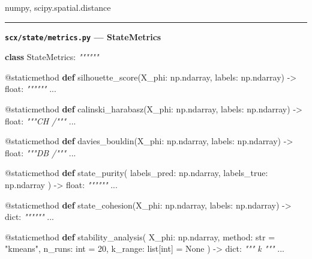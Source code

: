 \documentclass[
  12pt,
]{article}
\newenvironment{Shaded}{}{}
\newcommand{\AttributeTok}[1]{\textcolor[rgb]{0.49,0.56,0.16}{#1}}
\newcommand{\BuiltInTok}[1]{\textcolor[rgb]{0.00,0.50,0.00}{#1}}
\newcommand{\CommentTok}[1]{\textcolor[rgb]{0.38,0.63,0.69}{\textit{#1}}}
\newcommand{\DecValTok}[1]{\textcolor[rgb]{0.25,0.63,0.44}{#1}}
\newcommand{\KeywordTok}[1]{\textcolor[rgb]{0.00,0.44,0.13}{\textbf{#1}}}
\newcommand{\NormalTok}[1]{#1}
\newcommand{\OperatorTok}[1]{\textcolor[rgb]{0.40,0.40,0.40}{#1}}
\newcommand{\StringTok}[1]{\textcolor[rgb]{0.25,0.44,0.63}{#1}}
\newcommand{\VariableTok}[1]{\textcolor[rgb]{0.10,0.09,0.49}{#1}}
\begin{document}
numpy, scipy.spatial.distance

\begin{center}\rule{0.5\linewidth}{0.5pt}\end{center}

\textbf{\texttt{scx/state/metrics.py} --- StateMetrics}



\begin{Shaded}
\begin{Highlighting}[]
\KeywordTok{class}\NormalTok{ StateMetrics:}
    \CommentTok{""""""}

    \AttributeTok{@staticmethod}
    \KeywordTok{def}\NormalTok{ silhouette\_score(X\_phi: np.ndarray, labels: np.ndarray) }\OperatorTok{{-}\textgreater{}} \BuiltInTok{float}\NormalTok{:}
        \CommentTok{""""""}
\NormalTok{        ...}

    \AttributeTok{@staticmethod}
    \KeywordTok{def}\NormalTok{ calinski\_harabasz(X\_phi: np.ndarray, labels: np.ndarray) }\OperatorTok{{-}\textgreater{}} \BuiltInTok{float}\NormalTok{:}
        \CommentTok{"""CH /"""}
\NormalTok{        ...}

    \AttributeTok{@staticmethod}
    \KeywordTok{def}\NormalTok{ davies\_bouldin(X\_phi: np.ndarray, labels: np.ndarray) }\OperatorTok{{-}\textgreater{}} \BuiltInTok{float}\NormalTok{:}
        \CommentTok{"""DB /"""}
\NormalTok{        ...}

    \AttributeTok{@staticmethod}
    \KeywordTok{def}\NormalTok{ state\_purity(}
\NormalTok{        labels\_pred: np.ndarray,}
\NormalTok{        labels\_true: np.ndarray}
\NormalTok{    ) }\OperatorTok{{-}\textgreater{}} \BuiltInTok{float}\NormalTok{:}
        \CommentTok{""""""}
\NormalTok{        ...}

    \AttributeTok{@staticmethod}
    \KeywordTok{def}\NormalTok{ state\_cohesion(X\_phi: np.ndarray, labels: np.ndarray) }\OperatorTok{{-}\textgreater{}} \BuiltInTok{dict}\NormalTok{:}
        \CommentTok{""""""}
\NormalTok{        ...}

    \AttributeTok{@staticmethod}
    \KeywordTok{def}\NormalTok{ stability\_analysis(}
\NormalTok{        X\_phi: np.ndarray,}
\NormalTok{        method: }\BuiltInTok{str} \OperatorTok{=} \StringTok{"kmeans"}\NormalTok{,}
\NormalTok{        n\_runs: }\BuiltInTok{int} \OperatorTok{=} \DecValTok{20}\NormalTok{,}
\NormalTok{        k\_range: }\BuiltInTok{list}\NormalTok{[}\BuiltInTok{int}\NormalTok{] }\OperatorTok{=} \VariableTok{None}
\NormalTok{    ) }\OperatorTok{{-}\textgreater{}} \BuiltInTok{dict}\NormalTok{:}
        \CommentTok{""" k """}
\NormalTok{        ...}
\end{Highlighting}
\end{Shaded}
\end{document}
